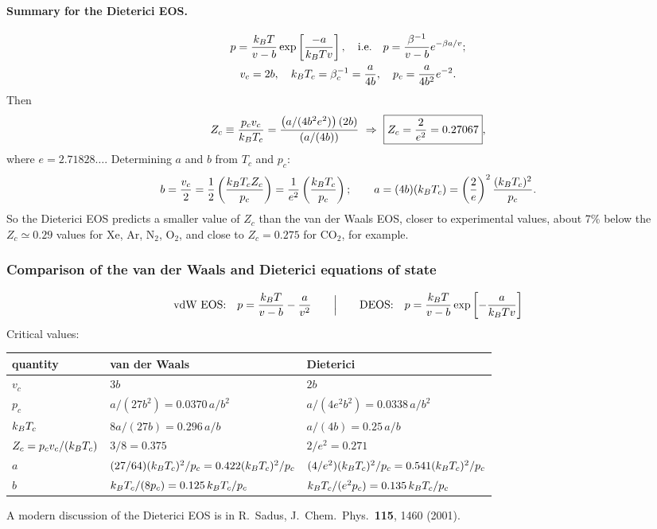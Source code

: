 \paragraph{Summary for the Dieterici EOS.}

\begin{gather}
  p = \frac{k_{B} T}{v-b}\exp\left[\frac{-a}{k_{B} Tv}\right],\quad\text{i.e.}\quad p = \frac{\beta^{-1}}{v-b}e^{-\beta a/v};\nonumber\\
  v_c = 2b,\quad k_{B} T_c = \beta_c^{-1} = \frac{a}{4b},\quad p_c = \frac{a}{4b^2}e^{-2}.
\end{gather}
Then
\begin{equation}
  Z_c\equiv\frac{p_cv_c}{k_{B} T_c} = \frac{\left(a/(4b^2e^2)\right)(2b)}{\left(a/(4b)\right)}
  \ \Rightarrow\ \boxed{Z_c = \frac{2}{e^2} = 0.27067},
\end{equation}
where $e = 2.71828\ldots$. Determining $a$ and $b$ from $T_c$ and $p_c$:
\begin{equation}
  b = \frac{v_c}{2} = \frac{1}{2}\left(\frac{k_{B} T_cZ_c}{p_c}\right) = \frac{1}{e^2}\left(\frac{k_{B} T_c}{p_c}\right);\qquad
  a = (4b)(k_{B} T_c) = \left(\frac{2}{e}\right)^2\frac{(k_{B} T_c)^2}{p_c}.
\end{equation}
So the Dieterici EOS predicts a smaller value of $Z_c$ than the van der Waals EOS, closer to experimental values, about
7\% below the $Z_c\simeq 0.29$ values for Xe, Ar, N$_2$, O$_2$, and close to $Z_c = 0.275$ for CO$_2$, for example.

\subsubsection*{Comparison of the van der Waals and Dieterici equations of state}

\begin{equation*}
  \text{vdW EOS:}\quad p = \frac{k_{B} T}{v-b} - \frac{a}{v^2}\qquad\Big|\qquad
  \text{DEOS:}\quad p = \frac{k_{B} T}{v-b}\exp\left[-\frac{a}{k_{B} Tv}\right]
\end{equation*}
Critical values:
\begin{center}
\small\renewcommand{\arraystretch}{1.6}\setlength{\tabcolsep}{4pt}
\begin{tabular}{l|l|l}
  quantity & van der Waals & Dieterici\\ \hline
  $v_c$ & $3b$ & $2b$\\
  $p_c$ & $a/(27b^2) = 0.0370\,a/b^2$ & $a/(4e^2b^2) = 0.0338\,a/b^2$\\
  $k_{B} T_c$ & $8a/(27b) = 0.296\,a/b$ & $a/(4b) = 0.25\,a/b$\\
  $Z_c = p_cv_c/(k_{B} T_c)$ & $3/8 = 0.375$ & $2/e^2 = 0.271$\\
  $a$ & $(27/64)(k_{B} T_c)^2/p_c = 0.422(k_{B} T_c)^2/p_c$ & $(4/e^2)(k_{B} T_c)^2/p_c = 0.541(k_{B} T_c)^2/p_c$\\
  $b$ & $k_{B} T_c/(8p_c) = 0.125\,k_{B} T_c/p_c$ & $k_{B} T_c/(e^2p_c) = 0.135\,k_{B} T_c/p_c$
\end{tabular}
\end{center}
A modern discussion of the Dieterici EOS is in R.~Sadus, J.\ Chem.\ Phys.\ \textbf{115}, 1460 (2001).

